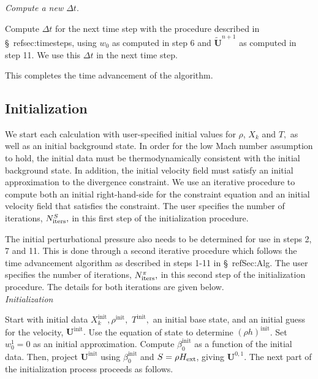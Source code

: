 \documentclass[11pt]{article}
\newcommand{\Hext}{{H_{\rm ext}}}
\newcommand{\initp}{\mathrm{init}}
\newcommand{\dt}{\Delta t}
\newcommand{\ubold}{\mathbf{U}}
\newcommand{\ut}{\widetilde{\ubold}}
\begin{document}
 {\em Compute a new $\dt.$}

Compute $\dt$ for the next time step with the procedure described in \S~ref{sec:timesteps},
using $w_0$ as computed in step 6 and
$\ut^{n+1}$ as computed in step 11.  We use this $\dt$ in the next time step. 

\noindent This completes the time advancement of the algorithm.

\subsection{Initialization}\label{Sec:Initialization}

We start each calculation with user-specified initial values for
$\rho$, $X_k$ and $T,$ as well as an initial background state.  In
order for the low Mach number assumption to hold, the initial data
must be thermodynamically consistent with the initial background
state.  In addition, the initial velocity field must satisfy an
initial approximation to the divergence constraint.  We use an iterative
procedure to compute both an initial right-hand-side for the
constraint equation and an initial velocity field that satisfies
the constraint.  The user specifies the number of iterations,
$N_{\rm iters}^{S},$ in this first step of the initialization procedure.

The initial perturbational pressure also needs to be determined for
use in steps 2, 7 and 11. 
This is done through a second iterative procedure which follows the
time advancement algorithm as described in steps 1-11 in \S~ref{Sec:Alg}.  
The user specifies the number of iterations, 
$N_{\rm iters}^{\pi},$ in this second step of the initialization procedure.
The details for both iterations are given below.\\

 {\em Initialization}

Start with initial data $X_k^{\initp}, \rho^{\initp},$ $T^{\initp},$ an 
initial base state, and an initial guess for the velocity, $\ubold^{\initp}.$
Use the equation of state to determine $(\rho h)^{\initp}$.  Set
$w_0^1 = 0$ as an initial approximation.  Compute $\beta_0^{\initp}$ as a function of 
the initial data.  Then, project $\ubold^{\initp}$ using $\beta_0^{\initp}$ and 
$S = \rho\Hext$, giving $\ubold^{0,1}$.  The next part of the initialization process 
proceeds as follows.
\end{document}
